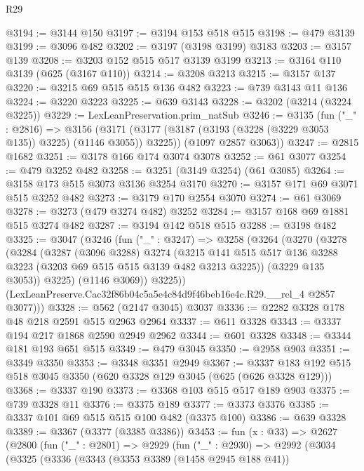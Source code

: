 \begin{lexlean}{R29}
\begin{coremodule}
@3194 := @3144 @150
@3197 := @3194 @153 @518 @515
@3198 := @479 @3139
@3199 := @3096 @482
@3202 := @3197 (@3198 @3199) @3183
@3203 := @3157 @139
@3208 := @3203 @152 @515 @517 @3139 @3199
@3213 := @3164 @110 @3139 (@625 (@3167 @110))
@3214 := @3208 @3213
@3215 := @3157 @137
@3220 := @3215 @69 @515 @515 @136 @482
@3223 := @739 @3143 @11 @136
@3224 := @3220 @3223
@3225 := @639 @3143
@3228 := @3202 (@3214 (@3224 @3225))
@3229 := LexLeanPreservation.prim_natSub
@3246 := @3135
    (fun ("_" : @2816) =>
    @3156
      (@3171 (@3177 (@3187 (@3193 (@3228 (@3229 @3053 @135)) @3225) (@1146 @3055)) @3225))
      (@1097 @2857 @3063))
@3247 := @2815 @1682
@3251 := @3178 @166 @174 @3074 @3078
@3252 := @61 @3077
@3254 := @479 @3252 @482
@3258 := @3251 (@3149 @3254) (@61 @3085)
@3264 := @3158 @173 @515 @3073 @3136 @3254 @3170
@3270 := @3157 @171 @69 @3071 @515 @3252 @482
@3273 := @3179 @170 @2554 @3070
@3274 := @61 @3069
@3278 := @3273 (@479 @3274 @482) @3252
@3284 := @3157 @168 @69 @1881 @515 @3274 @482
@3287 := @3194 @142 @518 @515
@3288 := @3198 @482
@3325 := @3047
    (@3246
      (fun ("_" : @3247) =>
      @3258
        (@3264
          (@3270
            (@3278
              (@3284
                (@3287
                  (@3096 @3288)
                  @3274
                  (@3215
                    @141
                    @515
                    @517
                    @136
                    @3288
                    @3223
                    (@3203 @69 @515 @515 @3139 @482 @3213 @3225))
                  (@3229 @135 @3053))
                @3225)
              (@1146 @3069))
            @3225))
        (LexLeanPreserve.Cac32f86b04c5a5e4c84d9f46beb16e4c.R29.__rel_4 @2857 @3077)))
@3328 := @562 (@2147 @3045) @3037
@3336 := @2282 @3328 @178 @48 @218 @2591 @515 @2963 @2964
@3337 := @611 @3328
@3343 := @3337 @194 @217 @1868 @2590 @2949 @2962
@3344 := @601 @3328
@3348 := @3344 @181 @193 @651 @515
@3349 := @479 @3045
@3350 := @2958 @903
@3351 := @3349 @3350
@3353 := @3348 @3351 @2949
@3367 := @3337 @183 @192 @515 @518 @3045 @3350 (@620 @3328 @129 @3045 (@625 (@626 @3328 @129)))
@3368 := @3337 @190
@3373 := @3368 @103 @515 @517 @189 @903
@3375 := @739 @3328 @11
@3376 := @3375 @189
@3377 := @3373 @3376
@3385 := @3337 @101 @69 @515 @515 @100 @482 (@3375 @100)
@3386 := @639 @3328
@3389 := @3367 (@3377 (@3385 @3386))
@3453 := fun (x : @33) =>
  @2627
    (@2800
      (fun ("_" : @2801) =>
      @2929
        (fun ("_" : @2930) =>
        @2992
          (@3034
            (@3325
              (@3336
                (@3343
                  (@3353 @3389 (@1458 @2945 @188 @41))

\end{coremodule}
\end{lexlean}
